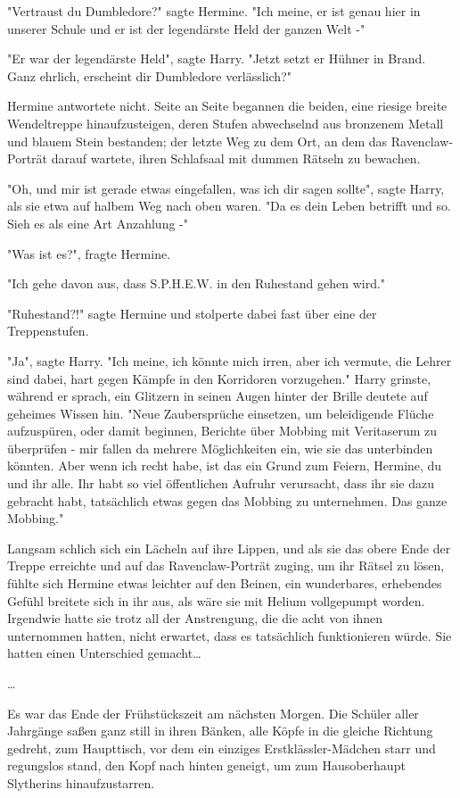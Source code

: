 {"Vertraust du Dumbledore?" sagte Hermine. "Ich meine, er ist genau hier in unserer Schule und er ist der legendärste Held der ganzen Welt -"

"Er war der legendärste Held", sagte Harry. "Jetzt setzt er Hühner in Brand. Ganz ehrlich, erscheint dir Dumbledore verlässlich?"

Hermine antwortete nicht. Seite an Seite begannen die beiden, eine riesige breite Wendeltreppe hinaufzusteigen, deren Stufen abwechselnd aus bronzenem Metall und blauem Stein bestanden; der letzte Weg zu dem Ort, an dem das Ravenclaw-Porträt darauf wartete, ihren Schlafsaal mit dummen Rätseln zu bewachen.

"Oh, und mir ist gerade etwas eingefallen, was ich dir sagen sollte", sagte Harry, als sie etwa auf halbem Weg nach oben waren. "Da es dein Leben betrifft und so. Sieh es als eine Art Anzahlung -"

"Was ist es?", fragte Hermine.

"Ich gehe davon aus, dass S.P.H.E.W. in den Ruhestand gehen wird."

"Ruhestand?!" sagte Hermine und stolperte dabei fast über eine der Treppenstufen.

"Ja", sagte Harry. "Ich meine, ich könnte mich irren, aber ich vermute, die Lehrer sind dabei, hart gegen Kämpfe in den Korridoren vorzugehen." Harry grinste, während er sprach, ein Glitzern in seinen Augen hinter der Brille deutete auf geheimes Wissen hin. "Neue Zaubersprüche einsetzen, um beleidigende Flüche aufzuspüren, oder damit beginnen, Berichte über Mobbing mit Veritaserum zu überprüfen - mir fallen da mehrere Möglichkeiten ein, wie sie das unterbinden könnten. Aber wenn ich recht habe, ist das ein Grund zum Feiern, Hermine, du und ihr alle. Ihr habt so viel öffentlichen Aufruhr verursacht, dass ihr sie dazu gebracht habt, tatsächlich etwas gegen das Mobbing zu unternehmen. Das ganze Mobbing."

Langsam schlich sich ein Lächeln auf ihre Lippen, und als sie das obere Ende der Treppe erreichte und auf das Ravenclaw-Porträt zuging, um ihr Rätsel zu lösen, fühlte sich Hermine etwas leichter auf den Beinen, ein wunderbares, erhebendes Gefühl breitete sich in ihr aus, als wäre sie mit Helium vollgepumpt worden. Irgendwie hatte sie trotz all der Anstrengung, die die acht von ihnen unternommen hatten, nicht erwartet, dass es tatsächlich funktionieren würde. Sie hatten einen Unterschied gemacht…

…

Es war das Ende der Frühstückszeit am nächsten Morgen. Die Schüler aller Jahrgänge saßen ganz still in ihren Bänken, alle Köpfe in die gleiche Richtung gedreht, zum Haupttisch, vor dem ein einziges Erstklässler-Mädchen starr und regungslos stand, den Kopf nach hinten geneigt, um zum Hausoberhaupt Slytherins hinaufzustarren.

}
